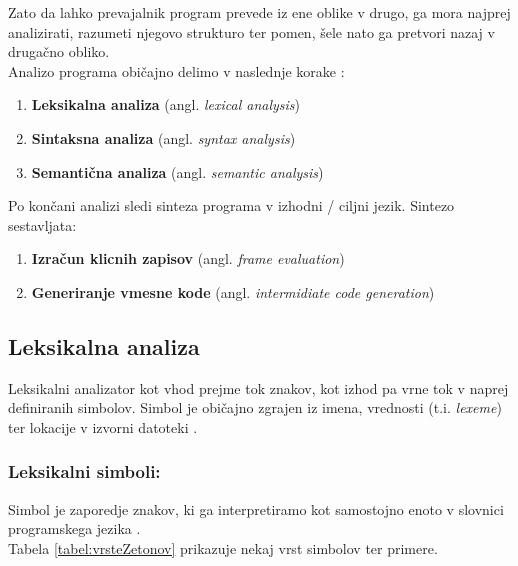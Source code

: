 \documentclass[a4paper, 12p]{book}
\begin{document}
Zato da lahko prevajalnik program prevede iz ene oblike v drugo, ga mora najprej analizirati, razumeti njegovo strukturo ter pomen, šele nato ga pretvori nazaj v drugačno obliko.  \\
Analizo programa običajno delimo v naslednje korake \cite{modernCompiler}:
\begin{enumerate}
	\item \textbf{Leksikalna analiza} (angl. \textit{lexical analysis})
	\item \textbf{Sintaksna analiza} (angl. \textit{syntax analysis})
	\item \textbf{Semantična analiza} (angl. \textit{semantic analysis})
\end{enumerate}

Po končani analizi sledi sinteza programa v izhodni / ciljni jezik. Sintezo sestavljata:
\begin{enumerate}
	\item \textbf{Izračun klicnih zapisov} (angl. \textit{frame evaluation})
	\item \textbf{Generiranje vmesne kode} (angl. \textit{intermidiate code generation})
\end{enumerate}

\subsection{Leksikalna analiza}

Leksikalni analizator kot vhod prejme tok znakov, kot izhod pa vrne tok v naprej definiranih simbolov. Simbol je običajno zgrajen iz imena, vrednosti (t.i. \textit{lexeme}) ter lokacije v izvorni datoteki \cite{modernCompiler}.

\subsubsection{Leksikalni simboli:}

Simbol je zaporedje znakov, ki ga interpretiramo kot samostojno enoto v slovnici programskega jezika \cite{modernCompiler}. \\ 
Tabela \ref{tabel:vrsteZetonov} prikazuje nekaj vrst simbolov ter primere. \\
\end{document}
